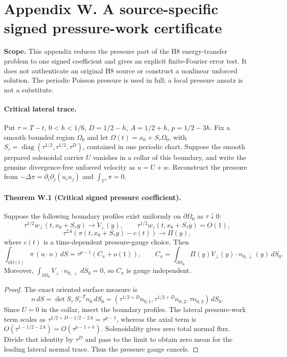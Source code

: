 \clearpage
\section*{Appendix W. A source-specific signed pressure-work certificate}
\noindent\textbf{Scope.} This appendix reduces the pressure part of the H8 energy-transfer problem to one signed coefficient and gives an explicit finite-Fourier error test. It does not authenticate an original H8 source or construct a nonlinear unforced solution. The periodic Poisson pressure is used in full; a local pressure ansatz is not a substitute.

\paragraph{Critical lateral trace.}
Put $\tau=T-t$, $0<h<1/6$, $D=1/2-h$, $A=1/2+h$, $p=1/2-3h$. Fix a smooth bounded region $\Omega_0$ and let $\Omega(t)=x_0+S_\tau\Omega_0$, with $S_\tau=\operatorname{diag}(\tau^{1/2},\tau^{1/2},\tau^D)$, contained in one periodic chart. Suppose the smooth prepared solenoidal carrier $U$ vanishes in a collar of this boundary, and write the genuine divergence-free unforced velocity as $u=U+w$. Reconstruct the pressure from $-\Delta\pi=\partial_i\partial_j(u_i u_j)$ and $\int_{\mathbb T^3}\pi=0$.

\paragraph{Theorem W.1 (Critical signed pressure coefficient).}
Suppose the following boundary profiles exist uniformly on $\partial\Omega_0$ as $\tau\downarrow0$:
\[
 \tau^{1/2}w_\perp(t,x_0+S_\tau y)\longrightarrow V_\perp(y),\qquad
 \tau^{1/2}w_z(t,x_0+S_\tau y)=O(1),
\]
\[
 \tau^{2A}(\pi(t,x_0+S_\tau y)-c(t))\longrightarrow\Pi(y),
\]
where $c(t)$ is a time-dependent pressure-gauge choice. Then
\begin{equation}\label{eq:W-coefficient}
 \boxed{\int_{\partial\Omega(t)}\pi\,(u\cdot n)\,dS
 =\tau^{p-1}(C_\pi+o(1)),\qquad
 C_\pi=\int_{\partial\Omega_0}\Pi(y)V_\perp(y)\cdot n_{0,\perp}(y)\,dS_0.}
\end{equation}
Moreover, $\int_{\partial\Omega_0}V_\perp\cdot n_{0,\perp}\,dS_0=0$, so $C_\pi$ is gauge independent.
\begin{proof}
The exact oriented surface measure is
\[
 n\,dS=\det S_\tau\,S_\tau^{-T}n_0\,dS_0
 =(\tau^{1/2+D}n_{0,1},\tau^{1/2+D}n_{0,2},\tau n_{0,3})\,dS_0.
\]
Since $U=0$ in the collar, insert the boundary profiles. The lateral pressure-work term scales as $\tau^{1/2+D-1/2-2A}=\tau^{p-1}$, whereas the axial term is $O(\tau^{1-1/2-2A})=O(\tau^{p-1+h})$. Solenoidality gives zero total normal flux. Divide that identity by $\tau^D$ and pass to the limit to obtain zero mean for the leading lateral normal trace. Thus the pressure gauge cancels.
\end{proof}

